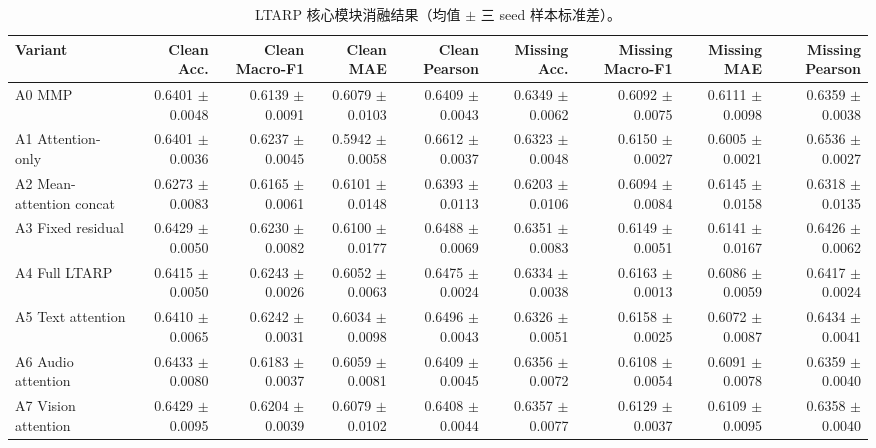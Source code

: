 \begin{table}[t]
\centering
\small
\caption{LTARP 核心模块消融结果（均值 $\pm$ 三 seed 样本标准差）。}
\label{tab:q2_ltarp_component_ablation}
\begin{tabular}{lrrrrrrrr}
\toprule
Variant & Clean Acc. & Clean Macro-F1 & Clean MAE & Clean Pearson & Missing Acc. & Missing Macro-F1 & Missing MAE & Missing Pearson \\
\midrule
A0 MMP & 0.6401 $\pm$ 0.0048 & 0.6139 $\pm$ 0.0091 & 0.6079 $\pm$ 0.0103 & 0.6409 $\pm$ 0.0043 & 0.6349 $\pm$ 0.0062 & 0.6092 $\pm$ 0.0075 & 0.6111 $\pm$ 0.0098 & 0.6359 $\pm$ 0.0038 \\
A1 Attention-only & 0.6401 $\pm$ 0.0036 & 0.6237 $\pm$ 0.0045 & 0.5942 $\pm$ 0.0058 & 0.6612 $\pm$ 0.0037 & 0.6323 $\pm$ 0.0048 & 0.6150 $\pm$ 0.0027 & 0.6005 $\pm$ 0.0021 & 0.6536 $\pm$ 0.0027 \\
A2 Mean-attention concat & 0.6273 $\pm$ 0.0083 & 0.6165 $\pm$ 0.0061 & 0.6101 $\pm$ 0.0148 & 0.6393 $\pm$ 0.0113 & 0.6203 $\pm$ 0.0106 & 0.6094 $\pm$ 0.0084 & 0.6145 $\pm$ 0.0158 & 0.6318 $\pm$ 0.0135 \\
A3 Fixed residual & 0.6429 $\pm$ 0.0050 & 0.6230 $\pm$ 0.0082 & 0.6100 $\pm$ 0.0177 & 0.6488 $\pm$ 0.0069 & 0.6351 $\pm$ 0.0083 & 0.6149 $\pm$ 0.0051 & 0.6141 $\pm$ 0.0167 & 0.6426 $\pm$ 0.0062 \\
A4 Full LTARP & 0.6415 $\pm$ 0.0050 & 0.6243 $\pm$ 0.0026 & 0.6052 $\pm$ 0.0063 & 0.6475 $\pm$ 0.0024 & 0.6334 $\pm$ 0.0038 & 0.6163 $\pm$ 0.0013 & 0.6086 $\pm$ 0.0059 & 0.6417 $\pm$ 0.0024 \\
A5 Text attention & 0.6410 $\pm$ 0.0065 & 0.6242 $\pm$ 0.0031 & 0.6034 $\pm$ 0.0098 & 0.6496 $\pm$ 0.0043 & 0.6326 $\pm$ 0.0051 & 0.6158 $\pm$ 0.0025 & 0.6072 $\pm$ 0.0087 & 0.6434 $\pm$ 0.0041 \\
A6 Audio attention & 0.6433 $\pm$ 0.0080 & 0.6183 $\pm$ 0.0037 & 0.6059 $\pm$ 0.0081 & 0.6409 $\pm$ 0.0045 & 0.6356 $\pm$ 0.0072 & 0.6108 $\pm$ 0.0054 & 0.6091 $\pm$ 0.0078 & 0.6359 $\pm$ 0.0040 \\
A7 Vision attention & 0.6429 $\pm$ 0.0095 & 0.6204 $\pm$ 0.0039 & 0.6079 $\pm$ 0.0102 & 0.6408 $\pm$ 0.0044 & 0.6357 $\pm$ 0.0077 & 0.6129 $\pm$ 0.0037 & 0.6109 $\pm$ 0.0095 & 0.6358 $\pm$ 0.0040 \\
\bottomrule
\end{tabular}
\end{table}
